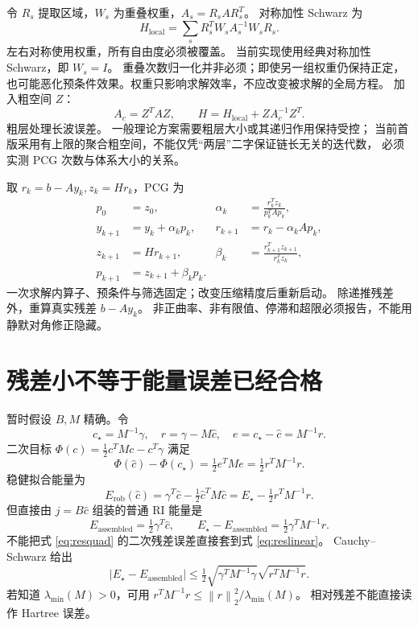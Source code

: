 \documentclass[UTF8,fontset=fandol,11pt,a4paper]{ctexart}
\numberwithin{equation}{section}
\newcommand{\norm}[1]{\left\lVert #1\right\rVert}
\begin{document}
令 \(R_s\) 提取区域，\(W_s\) 为重叠权重，\(A_s=R_sAR_s^T\)。
对称加性 Schwarz 为
\begin{equation}
H_{\mathrm{local}}=\sum_sR_s^TW_sA_s^{-1}W_sR_s.
\end{equation}
左右对称使用权重，所有自由度必须被覆盖。
当前实现使用经典对称加性 Schwarz，即 \(W_s=I\)。
重叠次数归一化并非必须；即使另一组权重仍保持正定，
也可能恶化预条件效果。权重只影响求解效率，不应改变被求解的全局方程。
加入粗空间 \(Z\)：
\begin{equation}
A_c=Z^TAZ,\qquad H=H_{\mathrm{local}}+ZA_c^{-1}Z^T.
\label{eq:precond}
\end{equation}
粗层处理长波误差。
一般理论方案需要粗层大小或其递归作用保持受控；
当前首版采用有上限的聚合粗空间，不能仅凭“两层”二字保证链长无关的迭代数，
必须实测 PCG 次数与体系大小的关系。

取 \(r_k=b-Ay_k,z_k=Hr_k\)，PCG 为
\begin{align}
p_0&=z_0,&
\alpha_k&=\frac{r_k^Tz_k}{p_k^TAp_k},\\
y_{k+1}&=y_k+\alpha_kp_k,&
r_{k+1}&=r_k-\alpha_kAp_k,\\
z_{k+1}&=Hr_{k+1},&
\beta_k&=\frac{r_{k+1}^Tz_{k+1}}{r_k^Tz_k},\\
p_{k+1}&=z_{k+1}+\beta_kp_k.
\end{align}
一次求解内算子、预条件与筛选固定；改变压缩精度后重新启动。
除递推残差外，重算真实残差 \(b-Ay_k\)。
非正曲率、非有限值、停滞和超限必须报告，不能用静默对角修正隐藏。

\section{残差小不等于能量误差已经合格}
\label{sec:error}
暂时假设 \(B,M\) 精确。令
\begin{equation}
c_\star=M^{-1}\gamma,\quad r=\gamma-M\widehat c,\quad
e=c_\star-\widehat c=M^{-1}r.
\end{equation}
二次目标 \(\Phi(c)=\tfrac12c^TMc-c^T\gamma\) 满足
\begin{equation}
\Phi(\widehat c)-\Phi(c_\star)
=\tfrac12e^TMe=\tfrac12r^TM^{-1}r.
\label{eq:resquad}
\end{equation}
稳健拟合能量为
\begin{equation}
E_{\mathrm{rob}}(\widehat c)
=\gamma^T\widehat c-\tfrac12\widehat c^TM\widehat c
=E_\star-\tfrac12r^TM^{-1}r.
\end{equation}
但直接由 \(j=B\widehat c\) 组装的普通 RI 能量是
\begin{equation}
E_{\mathrm{assembled}}=\tfrac12\gamma^T\widehat c,\qquad
E_\star-E_{\mathrm{assembled}}=\tfrac12\gamma^TM^{-1}r.
\label{eq:reslinear}
\end{equation}
不能把式 \eqref{eq:resquad} 的二次残差误差直接套到式 \eqref{eq:reslinear}。
Cauchy--Schwarz 给出
\begin{equation}
|E_\star-E_{\mathrm{assembled}}|
\leq\tfrac12\sqrt{\gamma^TM^{-1}\gamma}\sqrt{r^TM^{-1}r}.
\end{equation}
若知道 \(\lambda_{\min}(M)>0\)，可用
\(r^TM^{-1}r\leq\norm{r}_2^2/\lambda_{\min}(M)\)。
相对残差不能直接读作 Hartree 误差。
\end{document}
